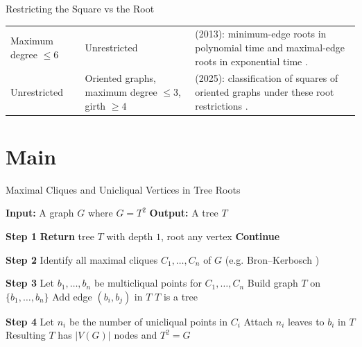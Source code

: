 \documentclass[10pt]{beamer}
\begin{document}
\begin{frame}{Restricting the Square vs the Root}
\begin{tabular}{p{2.0cm} p{2.0cm} p{6.0cm}}
        Maximum degree $\leq 6$
        & Unrestricted
        & \citeauthor{cochefert_et_al_2013_sparse_square_roots} (2013): minimum-edge roots in polynomial time and maximal-edge roots in exponential time
        \cite{cochefert_et_al_2013_sparse_square_roots}. \\[4pt]

        Unrestricted
        & Oriented graphs, maximum degree $\leq 3$, girth $\geq 4$
        & \citeauthor{duffy_2025_oriented_root} (2025): classification of squares of oriented graphs under these root restrictions
        \cite{duffy_2025_oriented_root}. \\
        \hline
    \end{tabular}
\end{frame}



\section[Main]{Main}


\begin{frame}{Maximal Cliques and Unicliqual Vertices in Tree Roots}
  \scriptsize
  \setlength{\itemsep}{0pt}
  \setlength{\parskip}{0pt}
  \setlength{\topsep}{0pt}
  \begin{algorithmic}[1]
    \State \textbf{Input:} A graph $G$ where $G = T^2$
    \State \textbf{Output:} A tree $T$

    \Statex \textbf{Step 1}
      \State \textbf{Return} tree $T$ with depth $1$, root any vertex
    \Else
      \State \textbf{Continue}
    \EndIf

    \Statex \textbf{Step 2}
    \State Identify all maximal cliques $C_1, \dots, C_n$ of $G$ (e.g. Bron--Kerbosch \cite{bron_kerbosch_1973_maximal_cliques}) 

    \Statex \textbf{Step 3}
    \State Let $b_1, \dots, b_n$ be multicliqual points for $C_1, \dots, C_n$ 
    \State Build graph $T$ on $\{b_1,\dots,b_n\}$
      \State Add edge $(b_i, b_j)$ in $T$
    \EndFor
    \State  $T$ is a tree

    \Statex \textbf{Step 4}
      \State Let $n_i$ be the number of unicliqual points in $C_i$
      \State Attach $n_i$ leaves to $b_i$ in $T$
    \EndFor
    \State Resulting $T$ has $|V(G)|$ nodes and $T^2 = G$
  \end{algorithmic}
\end{frame}
\end{document}

